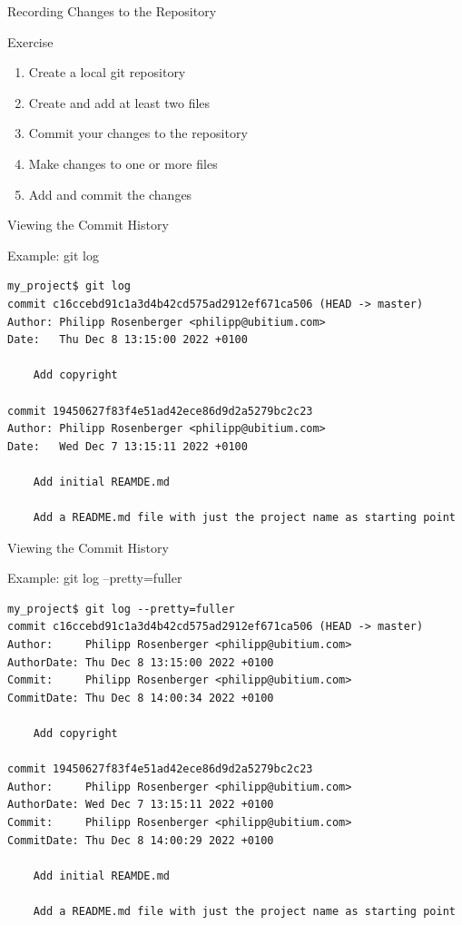 \documentclass[aspectratio=169]{beamer}
\renewcommand{\footnotesize}{\tiny}
\newcommand{\sectiontitle}{}
\begin{document}
\begin{frame}[fragile]{Recording Changes to the Repository}{\sectiontitle}
\begin{block}{Exercise}
\begin{enumerate}
    \item Create a local git repository
    \item Create and add at least two files
    \item Commit your changes to the repository
    \item Make changes to one or more files
    \item Add and commit the changes
\end{enumerate}
\end{block}
\end{frame}

\begin{frame}[fragile]{Viewing the Commit History}{\sectiontitle}
\begin{block}{Example: \ttfamily git log}
\begin{verbatim}
my_project$ git log
commit c16ccebd91c1a3d4b42cd575ad2912ef671ca506 (HEAD -> master)
Author: Philipp Rosenberger <philipp@ubitium.com>
Date:   Thu Dec 8 13:15:00 2022 +0100

    Add copyright

commit 19450627f83f4e51ad42ece86d9d2a5279bc2c23
Author: Philipp Rosenberger <philipp@ubitium.com>
Date:   Wed Dec 7 13:15:11 2022 +0100

    Add initial REAMDE.md

    Add a README.md file with just the project name as starting point

\end{verbatim}
\end{block}
\end{frame}

\begin{frame}[fragile]{Viewing the Commit History}{\sectiontitle}
\begin{block}{Example: \ttfamily git log --pretty=fuller}
\begin{verbatim}
my_project$ git log --pretty=fuller
commit c16ccebd91c1a3d4b42cd575ad2912ef671ca506 (HEAD -> master)
Author:     Philipp Rosenberger <philipp@ubitium.com>
AuthorDate: Thu Dec 8 13:15:00 2022 +0100
Commit:     Philipp Rosenberger <philipp@ubitium.com>
CommitDate: Thu Dec 8 14:00:34 2022 +0100

    Add copyright

commit 19450627f83f4e51ad42ece86d9d2a5279bc2c23
Author:     Philipp Rosenberger <philipp@ubitium.com>
AuthorDate: Wed Dec 7 13:15:11 2022 +0100
Commit:     Philipp Rosenberger <philipp@ubitium.com>
CommitDate: Thu Dec 8 14:00:29 2022 +0100

    Add initial REAMDE.md

    Add a README.md file with just the project name as starting point
\end{verbatim}
\end{block}
\end{frame}
\end{document}
